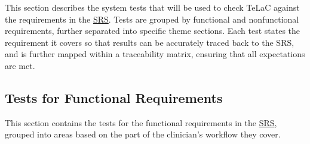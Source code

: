 \documentclass[12pt, titlepage]{article}
\newcommand{\SRSLink}{\href{https://github.com/Nour-Fawaz/MacaBoca/blob/main/pdfs/SRS/SRS.pdf}{SRS}}
\renewcommand{\_}{\oldunderscore\allowbreak}
\begin{document}
This section describes the system tests that will be used to check TeLaC
against the requirements in the \SRSLink{}. Tests are grouped by functional and
nonfunctional requirements, further separated into specific theme sections. Each
test states the requirement it covers so that results can be accurately traced
back to the SRS, and is further mapped within a traceability
matrix, ensuring that all expectations are met.

\subsection{Tests for Functional Requirements}

This section contains the tests for the functional requirements in the \SRSLink{},
grouped into areas based on the part of the clinician's workflow they cover.
\end{document}
